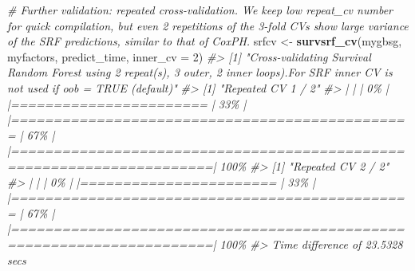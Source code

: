 \documentclass[
]{article}
\newenvironment{Shaded}{\begin{snugshade}}{\end{snugshade}}
\newcommand{\AttributeTok}[1]{\textcolor[rgb]{0.13,0.29,0.53}{#1}}
\newcommand{\CommentTok}[1]{\textcolor[rgb]{0.56,0.35,0.01}{\textit{#1}}}
\newcommand{\DecValTok}[1]{\textcolor[rgb]{0.00,0.00,0.81}{#1}}
\newcommand{\FunctionTok}[1]{\textcolor[rgb]{0.13,0.29,0.53}{\textbf{#1}}}
\newcommand{\NormalTok}[1]{#1}
\newcommand{\OtherTok}[1]{\textcolor[rgb]{0.56,0.35,0.01}{#1}}
\begin{document}
\begin{Shaded}
\begin{Highlighting}[]
\CommentTok{\# Further validation: repeated cross{-}validation. We keep low repeat\_cv number for quick compilation, but even 2 repetitions of the 3{-}fold CVs show large variance of the SRF predictions, similar to that of CoxPH.}
\NormalTok{srfcv }\OtherTok{\textless{}{-}} \FunctionTok{survsrf\_cv}\NormalTok{(mygbsg,}
\NormalTok{                    myfactors,}
\NormalTok{                    predict\_time,}
                    \AttributeTok{inner\_cv =} \DecValTok{2}\NormalTok{)}
\CommentTok{\#\textgreater{} [1] "Cross{-}validating Survival Random Forest using 2 repeat(s), 3 outer, 2 inner loops).For SRF inner CV is not used if oob = TRUE (default)"}
\CommentTok{\#\textgreater{} [1] "Repeated CV 1 / 2"}
\CommentTok{\#\textgreater{}   |                                                                              |                                                                      |   0\%  |                                                                              |=======================                                               |  33\%  |                                                                              |===============================================                       |  67\%  |                                                                              |======================================================================| 100\%}
\CommentTok{\#\textgreater{} [1] "Repeated CV 2 / 2"}
\CommentTok{\#\textgreater{}   |                                                                              |                                                                      |   0\%  |                                                                              |=======================                                               |  33\%  |                                                                              |===============================================                       |  67\%  |                                                                              |======================================================================| 100\%}
\CommentTok{\#\textgreater{} Time difference of 23.5328 secs}


\end{Highlighting}
\end{Shaded}
\end{document}
